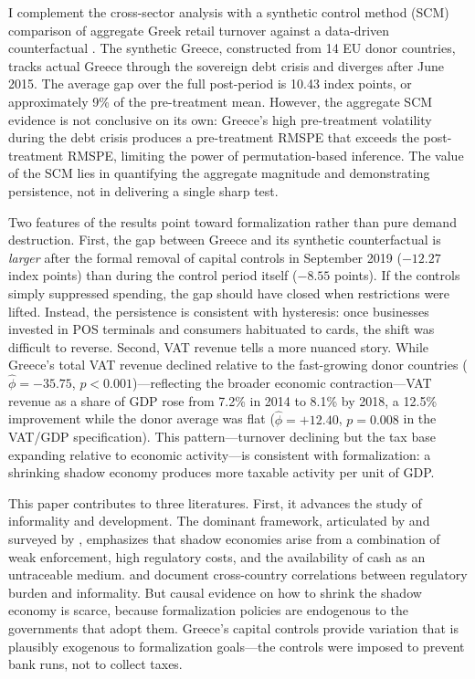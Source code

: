 \documentclass[12pt]{article}
\begin{document}
I complement the cross-sector analysis with a synthetic control method (SCM) comparison of aggregate Greek retail turnover against a data-driven counterfactual \citep{abadie2010synthetic, abadie2015comparative}. The synthetic Greece, constructed from 14 EU donor countries, tracks actual Greece through the sovereign debt crisis and diverges after June 2015. The average gap over the full post-period is 10.43 index points, or approximately 9\% of the pre-treatment mean. However, the aggregate SCM evidence is not conclusive on its own: Greece's high pre-treatment volatility during the debt crisis produces a pre-treatment RMSPE that exceeds the post-treatment RMSPE, limiting the power of permutation-based inference. The value of the SCM lies in quantifying the aggregate magnitude and demonstrating persistence, not in delivering a single sharp test.

Two features of the results point toward formalization rather than pure demand destruction. First, the gap between Greece and its synthetic counterfactual is \emph{larger} after the formal removal of capital controls in September 2019 ($-12.27$ index points) than during the control period itself ($-8.55$ points). If the controls simply suppressed spending, the gap should have closed when restrictions were lifted. Instead, the persistence is consistent with hysteresis: once businesses invested in POS terminals and consumers habituated to cards, the shift was difficult to reverse. Second, VAT revenue tells a more nuanced story. While Greece's total VAT revenue declined relative to the fast-growing donor countries ($\hat{\phi} = -35.75$, $p < 0.001$)---reflecting the broader economic contraction---VAT revenue as a share of GDP rose from 7.2\% in 2014 to 8.1\% by 2018, a 12.5\% improvement while the donor average was flat ($\hat{\phi} = +12.40$, $p = 0.008$ in the VAT/GDP specification). This pattern---turnover declining but the tax base expanding relative to economic activity---is consistent with formalization: a shrinking shadow economy produces more taxable activity per unit of GDP.

This paper contributes to three literatures. First, it advances the study of informality and development. The dominant framework, articulated by \citet{laporta2014informality} and surveyed by \citet{ulyssea2020informality}, emphasizes that shadow economies arise from a combination of weak enforcement, high regulatory costs, and the availability of cash as an untraceable medium. \citet{johnson1998regulatory} and \citet{loayza2016informality} document cross-country correlations between regulatory burden and informality. But causal evidence on how to shrink the shadow economy is scarce, because formalization policies are endogenous to the governments that adopt them. Greece's capital controls provide variation that is plausibly exogenous to formalization goals---the controls were imposed to prevent bank runs, not to collect taxes.
\end{document}
